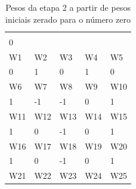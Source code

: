 \documentclass[11pt]{article}
\begin{document}
\begin{table}[h]
  \centering
  \caption{Pesos da etapa 2 a partir de pesos iniciais zerado para o número zero}
  \label{tab:wp0z_2}
  \begin{tabular}{lllll}
  \cellcolor[HTML]{000000}{\color[HTML]{FFFFFF} W0} &                            &                            &                            &                            \\
  0                                                 &                            &                            &                            &                            \\
  \rowcolor[HTML]{000000}
  {\color[HTML]{FFFFFF} W1}                         & {\color[HTML]{FFFFFF} W2}  & {\color[HTML]{FFFFFF} W3}  & {\color[HTML]{FFFFFF} W4}  & {\color[HTML]{FFFFFF} W5}  \\
  0                                                 & 1                          & 0                          & 1                          & 0                          \\
  \rowcolor[HTML]{000000}
  {\color[HTML]{FFFFFF} W6}                         & {\color[HTML]{FFFFFF} W7}  & {\color[HTML]{FFFFFF} W8}  & {\color[HTML]{FFFFFF} W9}  & {\color[HTML]{FFFFFF} W10} \\
  1                                                 & -1                         & -1                         & 0                          & 1                          \\
  \rowcolor[HTML]{000000}
  {\color[HTML]{FFFFFF} W11}                        & {\color[HTML]{FFFFFF} W12} & {\color[HTML]{FFFFFF} W13} & {\color[HTML]{FFFFFF} W14} & {\color[HTML]{FFFFFF} W15} \\
  1                                                 & 0                          & -1                         & 0                          & 1                          \\
  \rowcolor[HTML]{000000}
  {\color[HTML]{FFFFFF} W16}                        & {\color[HTML]{FFFFFF} W17} & {\color[HTML]{FFFFFF} W18} & {\color[HTML]{FFFFFF} W19} & {\color[HTML]{FFFFFF} W20} \\
  1                                                 & 0                          & -1                         & 0                          & 1                          \\
  \rowcolor[HTML]{000000}
  {\color[HTML]{FFFFFF} W21}                        & {\color[HTML]{FFFFFF} W22} & {\color[HTML]{FFFFFF} W23} & {\color[HTML]{FFFFFF} W24} & {\color[HTML]{FFFFFF} W25} \\

\end{tabular}
\end{table}
\end{document}
